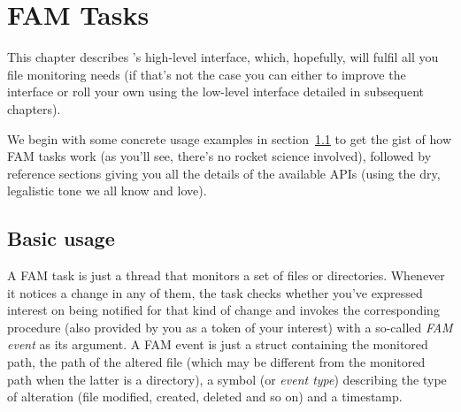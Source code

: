 
\chapter{FAM Tasks}
\label{cha:fam-tasks}

This chapter describes \MzFam's high-level interface, which,
hopefully, will fulfil all you file monitoring needs (if that's not
the case you can either  to improve the
interface or roll your own using the low-level interface detailed in
subsequent chapters).

We begin with some concrete usage examples in
section~\ref{sec:basic-usage} to get the gist of how FAM tasks work
(as you'll see, there's no rocket science involved), followed by
reference sections giving you all the details of the available APIs
(using the dry, legalistic tone we all know and love).

\section{Basic usage}
\label{sec:basic-usage}

A FAM task is just a thread that monitors a set of files or
directories. Whenever it notices a change in any of them, the task
checks whether you've expressed interest on being notified for that
kind of change and invokes the corresponding procedure (also provided
by you as a token of your interest) with a so-called \textit{FAM
  event} as its argument. A FAM event is just a struct containing the
monitored path, the path of the altered file (which may be different
from the monitored path when the latter is a directory), a symbol (or
\textit{event type}) describing the type of alteration (file modified,
created, deleted and so on) and a timestamp.

